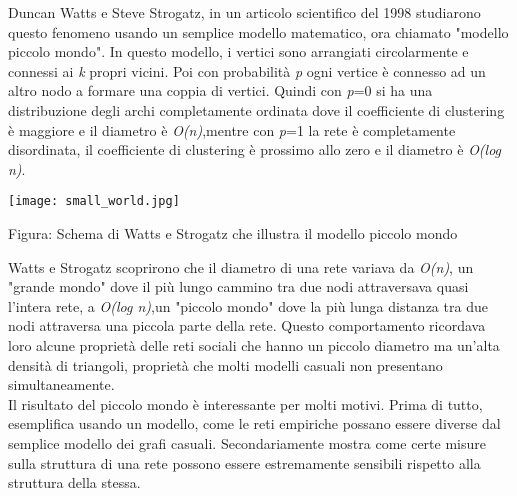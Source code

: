 \documentclass[twoside,openright,titlepage,fleqn,
	headinclude,11pt,a4paper,BCOR5mm,footinclude,pdftex
	]{scrbook}
\begin{document}
Duncan Watts e Steve Strogatz, in un articolo scientifico del 1998 studiarono questo fenomeno usando un semplice modello matematico, ora chiamato "modello piccolo mondo". In questo modello, i vertici sono arrangiati circolarmente e connessi ai \textit{k} propri vicini. Poi con probabilità \textit{p} ogni vertice è connesso ad un altro nodo a formare una coppia di vertici. Quindi con \textit{p}=0 si ha una distribuzione degli archi completamente ordinata dove il coefficiente di clustering è maggiore e il diametro è \textit{O(n)},mentre con \textit{p}=1 la rete è completamente disordinata, il coefficiente di clustering è prossimo allo zero e il diametro è \textit{O(log n)}.\\
\begin{center}
\texttt{[image: small\_world.jpg]}
\caption{Figura: Schema di Watts e Strogatz che illustra il modello piccolo mondo}
\end{center}
Watts e Strogatz scoprirono che il diametro di una rete variava da \textit{O(n)}, un "grande mondo" dove il più lungo cammino tra due nodi attraversava quasi l'intera rete, a \textit{O(log n)},un "piccolo mondo" dove la più lunga distanza tra due nodi attraversa una piccola parte della rete. Questo comportamento ricordava loro alcune proprietà delle reti sociali che hanno un piccolo diametro ma un'alta densità di triangoli, proprietà che molti modelli casuali non presentano simultaneamente.\\
Il risultato del piccolo mondo è interessante per molti motivi. Prima di tutto, esemplifica usando un modello, come le reti empiriche possano essere diverse dal semplice modello dei grafi casuali. Secondariamente mostra come certe misure sulla struttura di una rete possono essere estremamente sensibili rispetto alla struttura della stessa.
\end{document}
